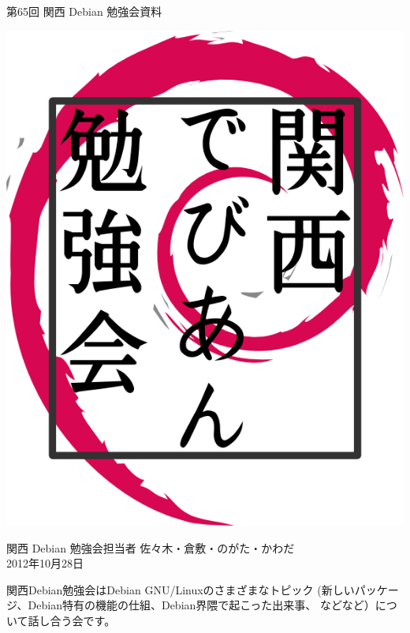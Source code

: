 \documentclass[mingoth,a4paper]{jsarticle}
\newcommand{\debmtgyear}{2012}
\newcommand{\debmtgdate}{28}
\newcommand{\debmtgmonth}{10}
\newcommand{\debmtgnumber}{65}
\begin{document}
\begin{titlepage}


 第\debmtgnumber{}回 関西 Debian 勉強会資料

\vspace{2cm}

\begin{center}
\includegraphics{image200802/kansaidebianlogo.png}
\end{center}

\begin{flushright}
\hfill{}関西 Debian 勉強会担当者 佐々木・倉敷・のがた・かわだ \\
\hfill{}\debmtgyear{}年\debmtgmonth{}月\debmtgdate{}日
\end{flushright}

\thispagestyle{empty}
\end{titlepage}


 関西Debian勉強会はDebian GNU/Linuxのさまざまなトピック
 (新しいパッケージ、Debian特有の機能の仕組、Debian界隈で起こった出来事、
 などなど）について話し合う会です。
\end{document}

